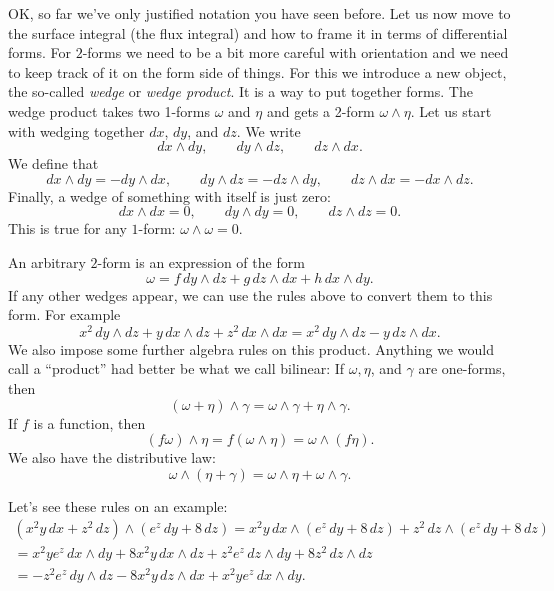 \documentclass[12pt]{article}
\begin{document}
OK, so far we've only justified notation you have seen before.
Let us now move to the surface integral (the flux integral) and how to frame it in terms
of differential forms.
For $2$-forms we need to be a bit more careful with orientation and we
need to keep track of it on the form side of things.  For this we introduce
a new object, the so-called \emph{wedge} or \emph{wedge product}.  It is a
way to put together forms.
The wedge product takes two 1-forms $\omega$ and $\eta$ and gets
a 2-form $\omega \wedge \eta$.  Let us start with wedging together $dx$, $dy$, and $dz$.
We write
\[
dx \wedge dy, \qquad
dy \wedge dz, \qquad
dz \wedge dx .
\]
We define that 
\[
dx \wedge dy = - dy \wedge dx, \qquad
dy \wedge dz = - dz \wedge dy, \qquad
dz \wedge dx = - dx \wedge dz .
\]
Finally, a wedge of something with itself is just zero:
\[
dx \wedge dx = 0, \qquad
dy \wedge dy = 0, \qquad
dz \wedge dz = 0 .
\]
This is true for any $1$-form: $\omega \wedge \omega = 0$.

An arbitrary $2$-form is an expression of the form
\[
\omega = 
f\, dy \wedge dz + 
g\, dz \wedge dx +
h\, dx \wedge dy .
\]
If any other wedges appear, we can use the rules above to convert them to this
form.  For example
\[
x^2 \, dy \wedge dz + 
y \, dx \wedge dz +
z^2\, dx \wedge dx 
=
x^2 \, dy \wedge dz - y \, dz \wedge dx .
\]
We also impose some further algebra rules on this product.  Anything we would
call a ``product'' had better be
what we call bilinear:  If $\omega, \eta$, and $\gamma$ are one-forms, then
\begin{equation*}
(\omega + \eta) \wedge \gamma
=
\omega \wedge \gamma
+
\eta \wedge \gamma .
\end{equation*}
If $f$ is a function, then
\begin{equation*}
(f \omega) \wedge \eta =
f (\omega \wedge \eta) =
\omega \wedge ( f \eta) .
\end{equation*}
We also have the distributive law:
\begin{equation*}
\omega \wedge (\eta + \gamma)
=
\omega \wedge \eta
+
\omega \wedge \gamma .
\end{equation*}

Let's see these rules on an example:
\begin{multline*}
( x^2 y \, dx + z^2 \, dz) \wedge (e^z \, dy + 8 \, dz)
=
x^2 y \, dx \wedge (e^z \, dy + 8 \, dz)
+
z^2 \, dz \wedge (e^z \, dy + 8 \, dz)
\\
=
x^2 y e^z \, dx \wedge dy
+
8 x^2 y \, dx \wedge dz
+
z^2 e^z \, dz \wedge dy
+
8 z^2 \, dz \wedge dz
\\
=
- z^2 e^z \, dy \wedge dz
-
8 x^2 y \, dz \wedge dx
+
x^2 y e^z \, dx \wedge dy .
\end{multline*}
\end{document}
